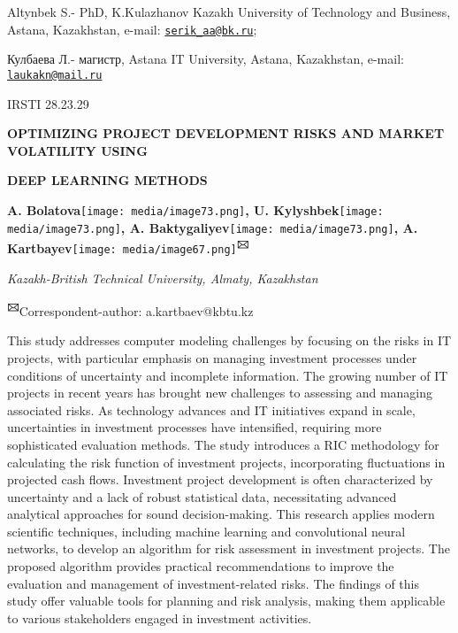 \documentclass[
]{article}
\begin{document}
Altynbek S.- PhD, K.Kulazhanov Kazakh University of Technology and
Business, Astana, Kazakhstan, e-mail:
\href{mailto:serik_aa@bk.ru}{\nolinkurl{serik\_aa@bk.ru}};

Кулбаева Л.- магистр, Astana IT University, Astana, Kazakhstan, e-mail:
\href{mailto:laukakn@mail.ru}{\nolinkurl{laukakn@mail.ru}}

IRSTI 28.23.29

\textbf{OPTIMIZING PROJECT DEVELOPMENT RISKS AND MARKET VOLATILITY
USING}

\textbf{DEEP LEARNING METHODS}

\textbf{A.
Bolatova}\texttt{[image: media/image73.png]}\textbf{,
U.
Kylyshbek}\texttt{[image: media/image73.png]}\textbf{,
A.
Baktygaliyev}\texttt{[image: media/image73.png]}\textbf{,
A.
Kartbayev}\texttt{[image: media/image67.png]}\textbf{\textsuperscript{🖂}}

\emph{Kazakh-British Technical University, Almaty, Kazakhstan}

\textbf{\textsuperscript{🖂}}Correspondent-author: a.kartbaev@kbtu.kz

This study addresses computer modeling challenges by focusing on the
risks in IT projects, with particular emphasis on managing investment
processes under conditions of uncertainty and incomplete information.
The growing number of IT projects in recent years has brought new
challenges to assessing and managing associated risks. As technology
advances and IT initiatives expand in scale, uncertainties in investment
processes have intensified, requiring more sophisticated evaluation
methods. The study introduces a RIC methodology for calculating the risk
function of investment projects, incorporating fluctuations in projected
cash flows. Investment project development is often characterized by
uncertainty and a lack of robust statistical data, necessitating
advanced analytical approaches for sound decision-making. This research
applies modern scientific techniques, including machine learning and
convolutional neural networks, to develop an algorithm for risk
assessment in investment projects. The proposed algorithm provides
practical recommendations to improve the evaluation and management of
investment-related risks. The findings of this study offer valuable
tools for planning and risk analysis, making them applicable to various
stakeholders engaged in investment activities.
\end{document}

